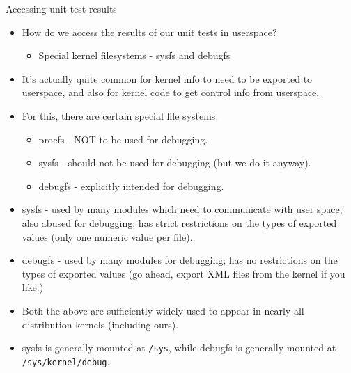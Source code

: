\documentclass{beamer}
\begin{document}
\begin{frame}{Accessing unit test results}

  \begin{itemize}

  \item How do we access the results of our unit tests in userspace?
    \begin{itemize}
    \item Special kernel filesystems - sysfs and debugfs
    \end{itemize}

  \item It's actually quite common for kernel info to need to be
    exported to userspace, and also for kernel code to get control
    info from userspace.
  \item For this, there are certain special file systems.
    \begin{itemize}
    \item procfs - NOT to be used for debugging.
    \item sysfs - should not be used for debugging (but we do it anyway).
    \item debugfs - explicitly intended for debugging.
    \end{itemize}
  \item sysfs - used by many modules which need to communicate with
    user space; also abused for debugging; has strict restrictions on
    the types of exported values (only one numeric value per file).
  \item debugfs - used by many modules for debugging; has no
    restrictions on the types of exported values (go ahead, export XML
    files from the kernel if you like.)
  \item Both the above are sufficiently widely used to appear in
    nearly all distribution kernels (including ours).
  \item sysfs is generally mounted at \texttt{/sys}, while debugfs is
    generally mounted at \texttt{/sys/kernel/debug}.
  \end{itemize}

\end{frame}
\end{document}
